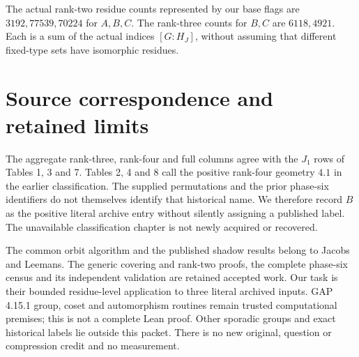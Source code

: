 \documentclass[11pt,a4paper]{article}
\begin{document}
The actual rank-two residue counts represented by our base flags are
$3192,77539,70224$ for $A,B,C$. The rank-three counts for $B,C$ are
$6118,4921$. Each is a sum of the actual indices $[G:H_J]$, without assuming
that different fixed-type sets have isomorphic residues.

\section{Source correspondence and retained limits}
The aggregate rank-three, rank-four and full columns agree with the $J_1$
rows of Tables 1, 3 and 7. Tables 2, 4 and 8 call the positive rank-four
geometry $4.1$ in the earlier classification. The supplied permutations
and the prior phase-six identifiers do not themselves identify that
historical name. We therefore record $B$ as the positive literal archive
entry without silently assigning a published label. The unavailable
classification chapter is not newly acquired or recovered.

The common orbit algorithm and the published shadow results belong to
Jacobs and Leemans. The generic covering and rank-two proofs, the complete
phase-six census and its independent validation are retained accepted
work. Our task is their bounded residue-level application to three
literal archived inputs. GAP 4.15.1 group, coset and automorphism routines
remain trusted computational premises; this is not a complete Lean proof.
Other sporadic groups and exact historical labels lie outside this packet.
There is no new original, question or compression credit and no measurement.
\end{document}
